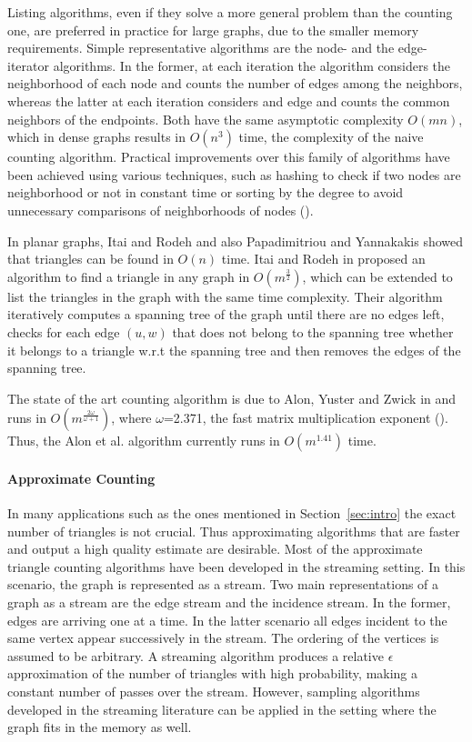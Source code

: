 \documentclass{llncs}
\begin{document}
Listing algorithms, even if they solve a more general problem than the counting one,
are preferred in practice for large graphs, due to the smaller memory requirements.
Simple representative algorithms are the node- and the edge-iterator algorithms.
In the former, at each iteration the algorithm considers the neighborhood of each node and counts
the number of edges among the neighbors, whereas the latter at each iteration considers and edge
and counts the common neighbors of the endpoints. Both have the same asymptotic complexity $O(mn)$, 
which in dense graphs results in $O(n^3)$ time, the complexity of the naive counting algorithm. 
Practical improvements over this family of algorithms have been achieved using various techniques, such as 
hashing to check if two nodes are neighborhood or not in constant time or sorting by the degree
to avoid unnecessary comparisons of neighborhoods of nodes (\cite{latapy,wagner:wagner}).

In planar graphs, Itai and Rodeh \cite{itai:rodeh} and also Papadimitriou and Yannakakis \cite{pap:yan} showed that triangles can be found in $O(n)$ time.
Itai and Rodeh in \cite{itai:rodeh} proposed an algorithm to find a triangle in any graph in $O(m^\frac{3}{2})$,
which can be extended to list the triangles in the graph with the same time complexity.
Their algorithm iteratively computes a spanning tree of the graph until there are no edges left, 
checks for each edge $(u,w)$ that does not belong to the spanning tree whether it belongs to
a triangle w.r.t the spanning tree and then removes the edges of the spanning tree.

The state of the art counting algorithm is due to Alon, Yuster and Zwick in \cite{alon:alon} and runs in $O(m^{\frac{2\omega}{\omega+1}})$,
where $\omega$=2.371, the fast matrix multiplication
exponent (\cite{CopperWino:CopperWino}). Thus, the Alon et al. algorithm currently runs in $O(m^{1.41})$ time. 

\paragraph{Approximate Counting} 
In many applications such as the ones mentioned in Section~\ref{sec:intro} the exact number of triangles is not crucial.
Thus approximating algorithms that are faster and output a high quality estimate are desirable. 
Most of the approximate triangle counting algorithms have been developed in the 
streaming setting. In this scenario, the graph is represented as a stream. 
Two main representations of a graph as a stream are the edge stream and the incidence stream. In the former, edges are arriving
one at a time. In the latter scenario
all edges incident to the same vertex appear successively in the stream. The ordering of the vertices 
is assumed to be arbitrary. A streaming algorithm produces a relative $\epsilon$ approximation 
of the number of triangles with high probability, making a constant number of passes over the stream. 
However, sampling algorithms developed in the streaming literature can be applied in the setting where the graph fits in the memory as well. 
\end{document}
